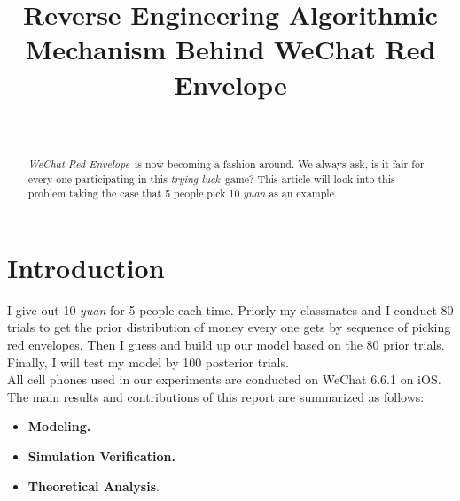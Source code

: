 \documentclass[10pt,journal]{IEEEtran}
\begin{document}
\title{Reverse Engineering Algorithmic Mechanism Behind WeChat Red Envelope}

\author{\\
} 
\maketitle

\begin{abstract}
	  \emph{WeChat Red Envelope}\ is now becoming a fashion around. We always ask, is it fair for every one participating in this \emph{trying-luck}\ game? This article will look into this problem taking the case that 5 people pick 10 \emph{yuan} as an example.
\end{abstract}


\section{Introduction}
	I give out 10 \emph{yuan} for 5 people each time. Priorly my classmates and I conduct 80 trials to get the prior distribution of money every one gets by sequence of picking red envelopes. Then I guess and build up our model based on the 80 prior trials. Finally, I will test my model by 100 posterior trials.
	\\
	All cell phones used in our experiments are conducted on WeChat 6.6.1 on iOS.
	\\
	The main results and contributions of this report are summarized as follows:
\begin{itemize}
  \item \textbf{Modeling.  }
  \item \textbf{Simulation Verification.}
  \item \textbf{Theoretical Analysis}.    
\end{itemize}
\end{document}
